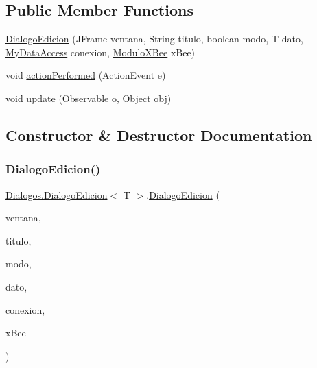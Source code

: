\subsection*{Public Member Functions}
\begin{DoxyCompactItemize}
\item 
\mbox{\hyperlink{class_dialogos_1_1_dialogo_edicion_a3faa9a40dae2814c946acaaacec3f708}{Dialogo\+Edicion}} (J\+Frame ventana, String titulo, boolean modo, T dato, \mbox{\hyperlink{classconexion_s_q_l_1_1_my_data_access}{My\+Data\+Access}} conexion, \mbox{\hyperlink{classcomunicacion_1_1_modulo_x_bee}{Modulo\+X\+Bee}} x\+Bee)
\item 
void \mbox{\hyperlink{class_dialogos_1_1_dialogo_edicion_a78705fff13d0b9999644b7a31ffea151}{action\+Performed}} (Action\+Event e)
\item 
void \mbox{\hyperlink{class_dialogos_1_1_dialogo_edicion_afcbec7817a74ba686ef1a00a33b48484}{update}} (Observable o, Object obj)
\end{DoxyCompactItemize}


\subsection{Constructor \& Destructor Documentation}
\mbox{\label{class_dialogos_1_1_dialogo_edicion_a3faa9a40dae2814c946acaaacec3f708}} 
\subsubsection{\texorpdfstring{Dialogo\+Edicion()}{DialogoEdicion()}}
{\footnotesize\ttfamily \mbox{\hyperlink{class_dialogos_1_1_dialogo_edicion}{Dialogos.\+Dialogo\+Edicion}}$<$ T $>$.\mbox{\hyperlink{class_dialogos_1_1_dialogo_edicion}{Dialogo\+Edicion}} (\begin{DoxyParamCaption}\item[{J\+Frame}]{ventana,  }\item[{String}]{titulo,  }\item[{boolean}]{modo,  }\item[{T}]{dato,  }\item[{\mbox{\hyperlink{classconexion_s_q_l_1_1_my_data_access}{My\+Data\+Access}}}]{conexion,  }\item[{\mbox{\hyperlink{classcomunicacion_1_1_modulo_x_bee}{Modulo\+X\+Bee}}}]{x\+Bee }\end{DoxyParamCaption})}

